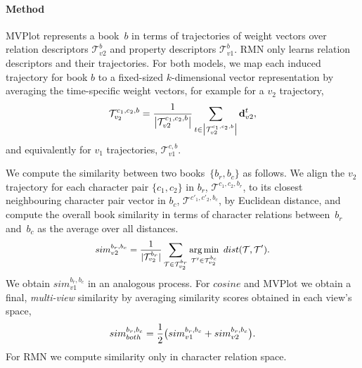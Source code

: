\documentclass[11pt,letterpaper]{article}
\DeclareMathOperator*{\argmin}{arg\,min}
\begin{document}
\paragraph{Method}
MVPlot represents a book~$b$ in terms of trajectories of weight vectors over relation descriptors $\mathbf{\mathcal{T}}_{v2}^b$ and property descriptors $\mathbf{\mathcal{T}}_{v1}^b$. RMN only learns relation descriptors and their trajectories. For both models, we map each induced trajectory for book $b$ to a fixed-sized $k$-dimensional vector representation by averaging the time-specific weight vectors, for example for a  $v_2$ trajectory,
\begin{equation}
\small
 \mathcal{T}_{v_2}^{c_1,c_2,b} = \frac{1}{\big|\mathbf{\mathcal{T}}_{v2}^{c_1,c_2,b}\big|} \sum_{t \in \big|\mathbf{\mathcal{T}}_{v2}^{c_1,c_2,b}\big|} \mathbf{d}_{v2}^t,
\end{equation}
and equivalently for $v_1$ trajectories, $\mathbf{\mathcal{T}}_{v1}^{c,b}$. 

We compute the similarity between two books~$\{b_{r},b_{c}\}$ as follows. We align the $v_2$ trajectory for each character pair $\{c_1,c_2\}$ in $b_{r}$, $\mathcal{T}^{c_1,c_2,b_{r}}$, to its closest neighbouring character pair vector in $b_{c}$, $\mathcal{T}^{c'_1,c'_2,b_{c}}$, by Euclidean distance, and compute the overall book similarity in terms of character relations between~$b_{r}$ and~$b_{c}$ as the average over all distances. 
\begin{equation}
\small
\begin{aligned}
 sim^{b_{r},b_{c}}_{v2} = \frac{1}{|\mathbf{\mathcal{T}}_{v_2}^{b_{r}}|} \sum_{\mathcal{T} \in \mathbf{\mathcal{T}}_{v_2}^{b_{r}}} \argmin_{\mathcal{T}' \in \mathbf{\mathcal{T}}_{v_2}^{b_{c}}}\ dist(\mathcal{T},\mathcal{T}').
 \end{aligned}
\end{equation}
We obtain $sim^{b_{r},b_{c}}_{v1}$ in an analogous process. 
For $cosine$ and MVPlot we obtain a final, {\it multi-view} similarity by averaging similarity scores obtained in each view's space, 
\begin{equation}
\small
 sim^{b_r,b_c}_{both} = \frac{1}{2} \big(sim^{b_{r},b_{c}}_{v1} + sim^{b_{r},b_{c}}_{v2}\big).
\end{equation}
For RMN we compute similarity only in character relation space.
\end{document}
